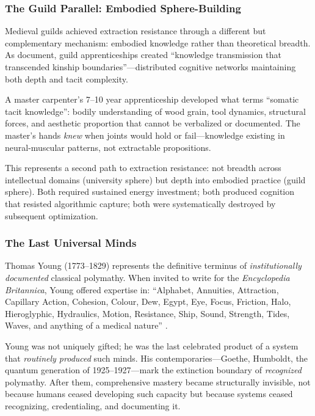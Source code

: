 \subsubsection{The Guild Parallel: Embodied Sphere-Building}

Medieval guilds achieved extraction resistance through a different but complementary mechanism: embodied knowledge rather than theoretical breadth. As \citet{delacroix2018} document, guild apprenticeships created ``knowledge transmission that transcended kinship boundaries''---distributed cognitive networks maintaining both depth and tacit complexity.

A master carpenter's 7--10 year apprenticeship developed what \citet{collins2010} terms ``somatic tacit knowledge'': bodily understanding of wood grain, tool dynamics, structural forces, and aesthetic proportion that cannot be verbalized or documented. The master's hands \textit{knew} when joints would hold or fail---knowledge existing in neural-muscular patterns, not extractable propositions.

This represents a second path to extraction resistance: not breadth across intellectual domains (university sphere) but depth into embodied practice (guild sphere). Both required sustained energy investment; both produced cognition that resisted algorithmic capture; both were systematically destroyed by subsequent optimization.

\subsubsection{The Last Universal Minds}

Thomas Young (1773--1829) represents the definitive terminus of \textit{institutionally documented} classical polymathy. When invited to write for the \textit{Encyclopedia Britannica}, Young offered expertise in: ``Alphabet, Annuities, Attraction, Capillary Action, Cohesion, Colour, Dew, Egypt, Eye, Focus, Friction, Halo, Hieroglyphic, Hydraulics, Motion, Resistance, Ship, Sound, Strength, Tides, Waves, and anything of a medical nature'' \citep{robinson2006}.

Young was not uniquely gifted; he was the last celebrated product of a system that \textit{routinely produced} such minds. His contemporaries---Goethe, Humboldt, the quantum generation of 1925--1927---mark the extinction boundary of \textit{recognized} polymathy. After them, comprehensive mastery became structurally invisible, not because humans ceased developing such capacity but because systems ceased recognizing, credentialing, and documenting it.

